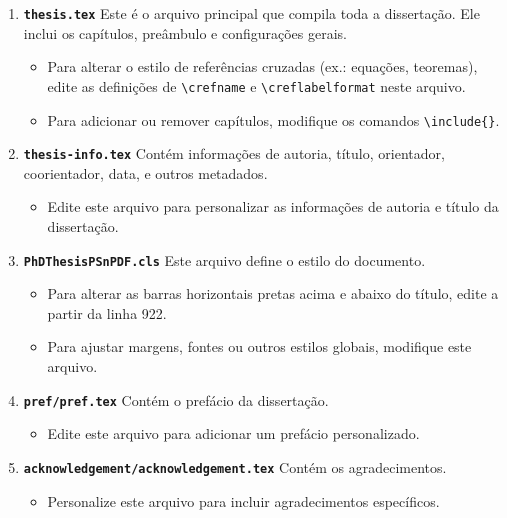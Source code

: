 \documentclass[a4paper,12pt]{article}
\begin{document}
\begin{enumerate}
    \item \textbf{\texttt{thesis.tex}}  
    Este é o arquivo principal que compila toda a dissertação. Ele inclui os capítulos, preâmbulo e configurações gerais.  
    \begin{itemize}
        \item Para alterar o estilo de referências cruzadas (ex.: equações, teoremas), edite as definições de \texttt{\textbackslash crefname} e \texttt{\textbackslash creflabelformat} neste arquivo.
        \item Para adicionar ou remover capítulos, modifique os comandos \texttt{\textbackslash include\{\}}.
    \end{itemize}

    \item \textbf{\texttt{thesis-info.tex}}  
    Contém informações de autoria, título, orientador, coorientador, data, e outros metadados.  
    \begin{itemize}
        \item Edite este arquivo para personalizar as informações de autoria e título da dissertação.
    \end{itemize}

    \item \textbf{\texttt{PhDThesisPSnPDF.cls}}  
    Este arquivo define o estilo do documento.  
    \begin{itemize}
        \item Para alterar as barras horizontais pretas acima e abaixo do título, edite a partir da linha 922.
        \item Para ajustar margens, fontes ou outros estilos globais, modifique este arquivo.
    \end{itemize}

    \item \textbf{\texttt{pref/pref.tex}}  
    Contém o prefácio da dissertação.  
    \begin{itemize}
        \item Edite este arquivo para adicionar um prefácio personalizado.
    \end{itemize}

    \item \textbf{\texttt{acknowledgement/acknowledgement.tex}}  
    Contém os agradecimentos.  
    \begin{itemize}
        \item Personalize este arquivo para incluir agradecimentos específicos.
    \end{itemize}


\end{enumerate}
\end{document}
